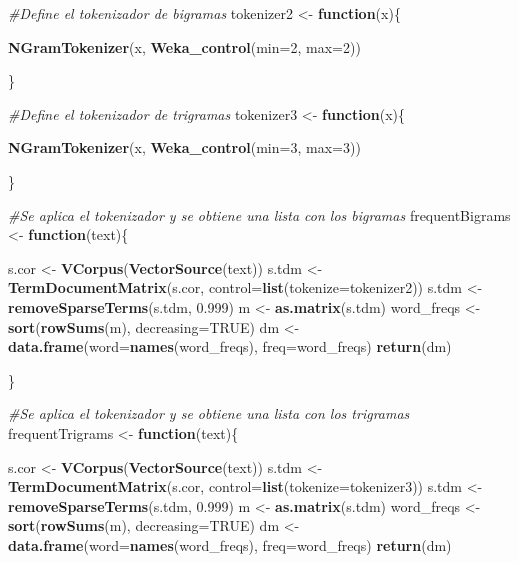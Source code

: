 \documentclass[
]{article}
\newenvironment{Shaded}{\begin{snugshade}}{\end{snugshade}}
\newcommand{\CommentTok}[1]{\textcolor[rgb]{0.56,0.35,0.01}{\textit{#1}}}
\newcommand{\ControlFlowTok}[1]{\textcolor[rgb]{0.13,0.29,0.53}{\textbf{#1}}}
\newcommand{\DataTypeTok}[1]{\textcolor[rgb]{0.13,0.29,0.53}{#1}}
\newcommand{\DecValTok}[1]{\textcolor[rgb]{0.00,0.00,0.81}{#1}}
\newcommand{\FloatTok}[1]{\textcolor[rgb]{0.00,0.00,0.81}{#1}}
\newcommand{\KeywordTok}[1]{\textcolor[rgb]{0.13,0.29,0.53}{\textbf{#1}}}
\newcommand{\NormalTok}[1]{#1}
\newcommand{\OtherTok}[1]{\textcolor[rgb]{0.56,0.35,0.01}{#1}}
\newcommand{\StringTok}[1]{\textcolor[rgb]{0.31,0.60,0.02}{#1}}
\begin{document}
\begin{Shaded}
\begin{Highlighting}[]
\CommentTok{#Define el tokenizador de bigramas}
\NormalTok{tokenizer2  <-}\StringTok{ }\ControlFlowTok{function}\NormalTok{(x)\{}

  \KeywordTok{NGramTokenizer}\NormalTok{(x, }\KeywordTok{Weka_control}\NormalTok{(}\DataTypeTok{min=}\DecValTok{2}\NormalTok{, }\DataTypeTok{max=}\DecValTok{2}\NormalTok{))}

\NormalTok{\}}

\CommentTok{#Define el tokenizador de trigramas}
\NormalTok{tokenizer3  <-}\StringTok{ }\ControlFlowTok{function}\NormalTok{(x)\{}

  \KeywordTok{NGramTokenizer}\NormalTok{(x, }\KeywordTok{Weka_control}\NormalTok{(}\DataTypeTok{min=}\DecValTok{3}\NormalTok{, }\DataTypeTok{max=}\DecValTok{3}\NormalTok{))}

\NormalTok{\}}

\CommentTok{#Se aplica el tokenizador y se obtiene una lista con los bigramas}
\NormalTok{frequentBigrams <-}\StringTok{ }\ControlFlowTok{function}\NormalTok{(text)\{}

\NormalTok{  s.cor <-}\StringTok{ }\KeywordTok{VCorpus}\NormalTok{(}\KeywordTok{VectorSource}\NormalTok{(text))}
\NormalTok{  s.tdm <-}\StringTok{ }\KeywordTok{TermDocumentMatrix}\NormalTok{(s.cor, }\DataTypeTok{control=}\KeywordTok{list}\NormalTok{(}\DataTypeTok{tokenize=}\NormalTok{tokenizer2))}
\NormalTok{  s.tdm <-}\StringTok{ }\KeywordTok{removeSparseTerms}\NormalTok{(s.tdm, }\FloatTok{0.999}\NormalTok{)}
\NormalTok{  m <-}\StringTok{ }\KeywordTok{as.matrix}\NormalTok{(s.tdm)}
\NormalTok{  word_freqs <-}\StringTok{ }\KeywordTok{sort}\NormalTok{(}\KeywordTok{rowSums}\NormalTok{(m), }\DataTypeTok{decreasing=}\OtherTok{TRUE}\NormalTok{)}
\NormalTok{  dm <-}\StringTok{ }\KeywordTok{data.frame}\NormalTok{(}\DataTypeTok{word=}\KeywordTok{names}\NormalTok{(word_freqs), }\DataTypeTok{freq=}\NormalTok{word_freqs)}
  \KeywordTok{return}\NormalTok{(dm)}

\NormalTok{\}}

\CommentTok{#Se aplica el tokenizador y se obtiene una lista con los trigramas}
\NormalTok{frequentTrigrams <-}\StringTok{ }\ControlFlowTok{function}\NormalTok{(text)\{}

\NormalTok{  s.cor <-}\StringTok{ }\KeywordTok{VCorpus}\NormalTok{(}\KeywordTok{VectorSource}\NormalTok{(text))}
\NormalTok{  s.tdm <-}\StringTok{ }\KeywordTok{TermDocumentMatrix}\NormalTok{(s.cor, }\DataTypeTok{control=}\KeywordTok{list}\NormalTok{(}\DataTypeTok{tokenize=}\NormalTok{tokenizer3))}
\NormalTok{  s.tdm <-}\StringTok{ }\KeywordTok{removeSparseTerms}\NormalTok{(s.tdm, }\FloatTok{0.999}\NormalTok{)}
\NormalTok{  m <-}\StringTok{ }\KeywordTok{as.matrix}\NormalTok{(s.tdm)}
\NormalTok{  word_freqs <-}\StringTok{ }\KeywordTok{sort}\NormalTok{(}\KeywordTok{rowSums}\NormalTok{(m), }\DataTypeTok{decreasing=}\OtherTok{TRUE}\NormalTok{)}
\NormalTok{  dm <-}\StringTok{ }\KeywordTok{data.frame}\NormalTok{(}\DataTypeTok{word=}\KeywordTok{names}\NormalTok{(word_freqs), }\DataTypeTok{freq=}\NormalTok{word_freqs)}
  \KeywordTok{return}\NormalTok{(dm)}


\end{Highlighting}
\end{Shaded}
\end{document}
